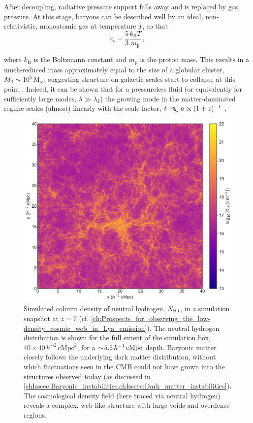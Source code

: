 After decoupling, radiative pressure support falls away and is replaced by gas pressure. At this stage, baryons can be described well by an ideal, non-relativistic, monoatomic gas at temperature $T$, so that
\begin{equation}
    \label{chIeq:Ideal_gas}
    c_\text{s} = \frac{5}{3} \frac{k_\text{B} T}{m_\text{p}} \, ,
\end{equation}

\noindent where $k_\text{B}$ is the Boltzmann constant and $m_\text{p}$ is the proton mass. This results in a much-reduced \citeauthor{1902RSPTA.199....1J} mass approximately equal to the size of a globular cluster, $M_\text{J} \sim 10^{6} \, \mathrm{M_\odot}$, suggesting structure on galactic scales start to collapse at this point \citep{2010gfe..book.....M}. Indeed, it can be shown that for a pressureless fluid (or equivalently for sufficiently large modes, $\lambda \gg \lambda_\text{J}$) the growing mode in the matter-dominated regime scales (almost) linearly with the scale factor, $\delta \appropto a \propto (1+z)^{-1}$ \citep{1992ARA&A..30..499C}.
\begin{figure}
    \centering
    \includegraphics[width=\linewidth]{"Figs/Neutral_gas_distribution"}
    \caption[Simulated column density of neutral hydrogen at $z=4.8$.]{Simulated column density of neutral hydrogen, $N_\text{\ion{H}{I}}$, in a simulation snapshot at $z = 7$ (cf. \cref{ch:Prospects_for_observing_the_low-density_cosmic_web_in_Lya_emission}). The neutral hydrogen distribution is shown for the full extent of the simulation box, $40 \times 40 \, h^{-2} \, \mathrm{cMpc}^2$, for a $\sim \! 5.5 \, h^{-1} \, \mathrm{cMpc}$ depth. Baryonic matter closely follows the underlying dark matter distribution, without which fluctuations seen in the CMB could not have grown into the structures observed today (as discussed in \cref{chIsssec:Baryonic_instabilities,chIsssec:Dark_matter_instabilities}). The cosmological density field (here traced via neutral hydrogen) reveals a complex, web-like structure with large voids and overdense regions.}
    \label{chIfig:Neutral_gas_distribution}
\end{figure}

